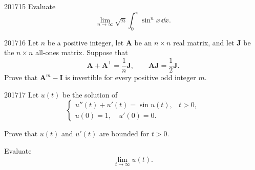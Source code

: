 \begin{problem}{2017}{1}{5}
Evaluate
\[
    \lim_{n\to\infty}
    \sqrt n\int_0^{\pi}\sin^n x\, \dd x.
\]
\end{problem}

\begin{problem}{2017}{1}{6}
Let $n$ be a positive integer, let $\mathbf A$ be an $n\times n$ real matrix, and let $\mathbf J$ be the $n\times n$ all-ones matrix. Suppose that
\[
    \mathbf A+\mathbf A^{\mathsf T}=\frac1n\mathbf J,
    \qquad
    \mathbf A\mathbf J=\frac12\mathbf J.
\]
Prove that $\mathbf A^m-\mathbf I$ is invertible for every positive odd integer $m$.
\end{problem}

\begin{problem}{2017}{1}{7}
Let $u(t)$ be the solution of
\[
\begin{cases}
    u''(t)+u'(t)=\sin u(t), & t>0, \\
    u(0)=1, \quad u'(0)=0.
\end{cases}
\]
\begin{problemsubparts}
    \item Prove that $u(t)$ and $u'(t)$ are bounded for $t>0$.
    \item Evaluate
    \[
        \lim_{t\to\infty}u(t).
    \]
\end{problemsubparts}
\end{problem}
